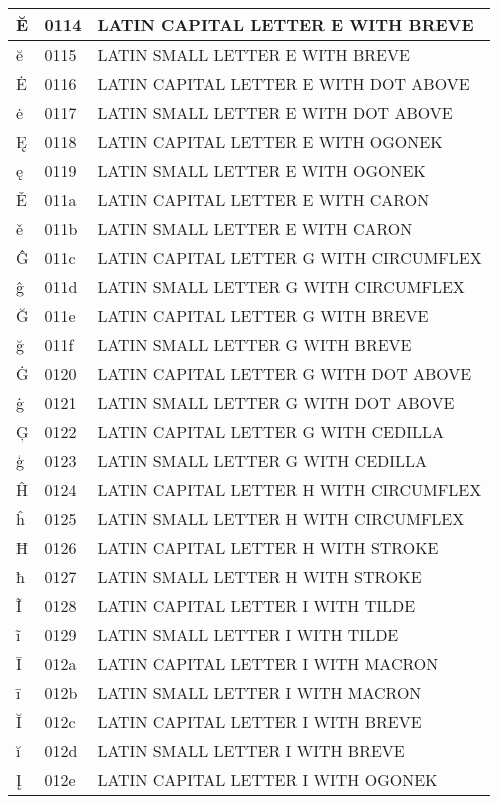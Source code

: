 \documentclass[12pt,letterpaper,openany]{book}
\begin{document}
\begin{center}
\begin{supertabular}{|m{0.25in}|m{0.5in}|m{4in}|}
			Ĕ & 0114 & LATIN CAPITAL LETTER E WITH BREVE\\\hline
			ĕ & 0115 & LATIN SMALL LETTER E WITH BREVE\\\hline
			Ė & 0116 & LATIN CAPITAL LETTER E WITH DOT ABOVE\\\hline
			ė & 0117 & LATIN SMALL LETTER E WITH DOT ABOVE\\\hline
			Ę & 0118 & LATIN CAPITAL LETTER E WITH OGONEK\\\hline
			ę & 0119 & LATIN SMALL LETTER E WITH OGONEK\\\hline
			Ě & 011a & LATIN CAPITAL LETTER E WITH CARON\\\hline
			ě & 011b & LATIN SMALL LETTER E WITH CARON\\\hline
			Ĝ & 011c & LATIN CAPITAL LETTER G WITH CIRCUMFLEX\\\hline
			ĝ & 011d & LATIN SMALL LETTER G WITH CIRCUMFLEX\\\hline
			Ğ & 011e & LATIN CAPITAL LETTER G WITH BREVE\\\hline
			ğ & 011f & LATIN SMALL LETTER G WITH BREVE\\\hline
			Ġ & 0120 & LATIN CAPITAL LETTER G WITH DOT ABOVE\\\hline
			ġ & 0121 & LATIN SMALL LETTER G WITH DOT ABOVE\\\hline
			Ģ & 0122 & LATIN CAPITAL LETTER G WITH CEDILLA\\\hline
			ģ & 0123 & LATIN SMALL LETTER G WITH CEDILLA\\\hline
			Ĥ & 0124 & LATIN CAPITAL LETTER H WITH CIRCUMFLEX\\\hline
			ĥ & 0125 & LATIN SMALL LETTER H WITH CIRCUMFLEX\\\hline
			Ħ & 0126 & LATIN CAPITAL LETTER H WITH STROKE\\\hline
			ħ & 0127 & LATIN SMALL LETTER H WITH STROKE\\\hline
			Ĩ & 0128 & LATIN CAPITAL LETTER I WITH TILDE\\\hline
			ĩ & 0129 & LATIN SMALL LETTER I WITH TILDE\\\hline
			Ī & 012a & LATIN CAPITAL LETTER I WITH MACRON\\\hline
			ī & 012b & LATIN SMALL LETTER I WITH MACRON\\\hline
			Ĭ & 012c & LATIN CAPITAL LETTER I WITH BREVE\\\hline
			ĭ & 012d & LATIN SMALL LETTER I WITH BREVE\\\hline
			Į & 012e & LATIN CAPITAL LETTER I WITH OGONEK\\\hline

\end{supertabular}
\end{center}
\end{document}
